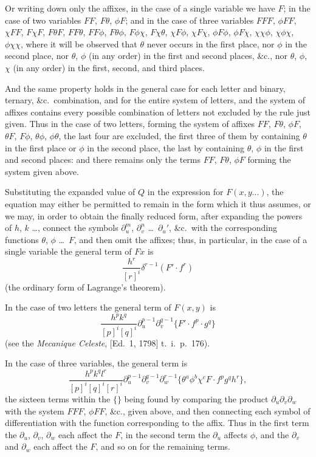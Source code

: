 \documentclass[11pt,a4paper]{article}
\theoremstyle{plain}
\begin{document}
Or writing down only the affixes, in the case of a single variable we have $F$; in the case of two variables $FF$, $F\theta$, $\phi F$; and in the case of three variables $FFF$, $\phi FF$, $\chi FF$, $F\chi F$, $F\theta F$, $FF\theta$, $FF\phi$, $F\theta\phi$, $F\phi\chi$, $F\chi\theta$, $\chi F\phi$, $\chi F\chi$, $\phi F\phi$, $\phi F\chi$, $\chi\chi\phi$, $\chi\phi\chi$, $\phi\chi\chi$, where it will be observed that $\theta$ never occurs in the first place, nor $\phi$ in the second place, nor $\theta$, $\phi$ (in any order) in the first and second places, \&c., nor $\theta$, $\phi$, $\chi$ (in any order) in the first, second, and third places.

And the same property holds in the general case for each letter and binary, ternary, \&c.\ combination, and for the entire system of letters, and the system of affixes contains every possible combination of letters not excluded by the rule just given. Thus in the case of two letters, forming the system of affixes $FF$, $F\theta$, $\phi F$, $\theta F$, $F\phi$, $\theta\phi$, $\phi\theta$, the last four are excluded, the first three of them by containing $\theta$ in the first place or $\phi$ in the second place, the last by containing $\theta$, $\phi$ in the first and second places: and there remains only the terms $FF$, $F\theta$, $\phi F$ forming the system given above.

Substituting the expanded value of $Q$ in the expression for $F(x,y\ldots)$, the equation may either be permitted to remain in the form which it thus assumes, or we may, in order to obtain the finally reduced form, after expanding the powers of $h$, $k$ \ldots, connect the symbols $\partial_u^m$, $\partial_v^n$ \ldots\ $\partial_u'$, \&c.\ with the corresponding functions $\theta$, $\phi$ \ldots\ $F$, and then omit the affixes; thus, in particular, in the case of a single variable the general term of $Fx$ is
\[ \frac{h^r}{[r]^i} \delta^{r-1}(F' \cdot f^r) \]
(the ordinary form of Lagrange's theorem).

In the case of two letters the general term of $F(x,y)$ is
\[ \frac{h^p k^q}{[p]^i [q]^i} \partial_u^{p-1} \partial_v^{q-1} \{ F' \cdot f^p \cdot g^q \} \]
(see the \textit{Mecanique Celeste}, [Ed.\ 1, 1798] t.\ i.\ p.\ 176).

In the case of three variables, the general term is
\[ \frac{h^p k^q l^r}{[p]^i [q]^i [r]^i} \partial_u^{p-1} \partial_v^{q-1} \partial_w^{r-1} \{ \theta^a \phi^b \chi^c F \cdot f^p g^q h^r \}, \]
the sixteen terms within the $\{ \}$ being found by comparing the product $\partial_u \partial_v \partial_w$ with the system $FFF$, $\phi FF$, \&c., given above, and then connecting each symbol of differentiation with the function corresponding to the affix. Thus in the first term the $\partial_u$, $\partial_v$, $\partial_w$ each affect the $F$, in the second term the $\partial_u$ affects $\phi$, and the $\partial_v$ and $\partial_w$ each affect the $F$, and so on for the remaining terms.
\end{document}
